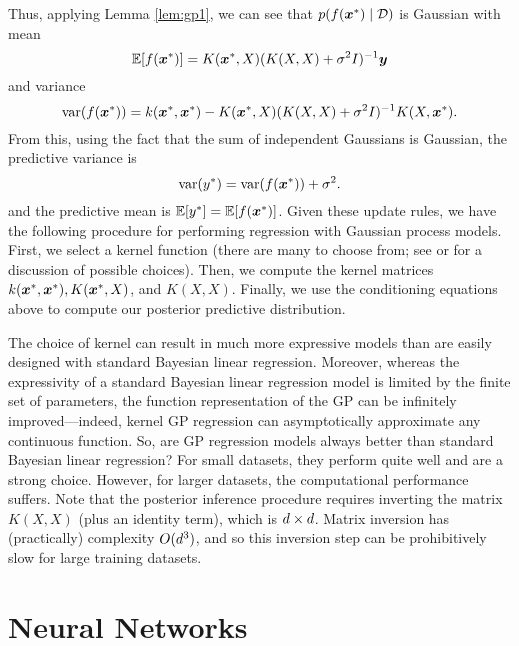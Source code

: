 Thus, applying Lemma \ref{lem:gp1}, we can see that $p(f(\bm{x}^*) \mid \mathcal{D})$ is Gaussian with mean
\begin{equation}
    \mathbb{E}[f(\bm{x}^*)] = K(\bm{x}^*, X) (K(X, X) + \sigma^2 I)^{-1} \bm{y}
\end{equation}
and variance
\begin{equation}
    \text{var}(f(\bm{x}^*)) = k(\bm{x}^*, \bm{x}^*) - K(\bm{x}^*, X) (K(X, X) + \sigma^2 I)^{-1} K(X, \bm{x}^*).
\end{equation}
From this, using the fact that the sum of independent Gaussians is Gaussian, the predictive variance is 
\begin{equation}
    \text{var}(y^*) = \text{var}(f(\bm{x}^*)) + \sigma^2.
\end{equation}
and the predictive mean is $\mathbb{E}[y^*] = \mathbb{E}[f(\bm{x}^*)]$. Given these update rules, we have the following procedure for performing regression with Gaussian process models. First, we select a kernel function (there are many to choose from; see \cite{rasmussen2003gaussian} or \cite{murphy2012machine} for a discussion of possible choices). Then, we compute the kernel matrices $k(\bm{x}^*, \bm{x}^*), K(\bm{x}^*, X)$, and $K(X,X)$. Finally, we use the conditioning equations above to compute our posterior predictive distribution. 

The choice of kernel can result in much more expressive models than are easily designed with standard Bayesian linear regression. Moreover, whereas the expressivity of a standard Bayesian linear regression model is limited by the finite set of parameters, the function representation of the GP can be infinitely improved---indeed, kernel GP regression can asymptotically approximate any continuous function. %
So, are GP regression models always better than standard Bayesian linear regression? For small datasets, they perform quite well and are a strong choice. However, for larger datasets, the computational performance suffers. Note that the posterior inference procedure requires inverting the matrix $K(X,X)$ (plus an identity term), which is $d \times d$. Matrix inversion has (practically) complexity $O(d^3)$, and so this inversion step can be prohibitively slow for large training datasets. 


\section{Neural Networks}

